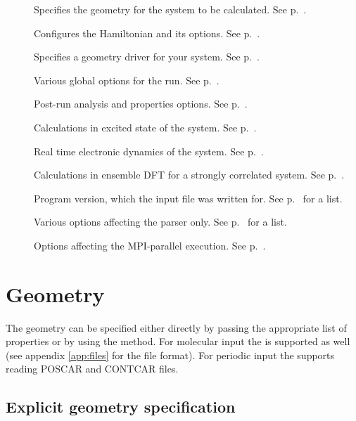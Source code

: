 \begin{description}
\item[] Specifies the geometry for the system to be
  calculated.  See p.~.
\item[] Configures the Hamiltonian and its options. See
  p.~.
\item[] Specifies a geometry driver for your system.  See
  p.~.
\item[]  Various global options for the run. See
  p.~.
\item[]  Post-run analysis and properties options. See
  p.~.
\item[] Calculations in excited state of the system.
  See p.~.
\item[] Real time electronic dynamics of the system.  See
  p.~.
\item[] Calculations in ensemble DFT for a strongly correlated system.
  See p.~.
\item[] Program version, which the input file was
  written for. See p.~ for a list.
\item[] Various options affecting the parser only.
  See p.~ for a list.
\item[] Options affecting the MPI-parallel execution. See
  p.~.
\end{description}


\section{Geometry}
\label{sec:dftbp.Geometry}

The geometry can be specified either directly by passing the
appropriate list of properties or by using the 
method.  For molecular input the  is supported as
well (see appendix \ref{app:files} for the file format).  For periodic
input the  supports reading POSCAR and CONTCAR
files.

\subsection{Explicit geometry specification}

